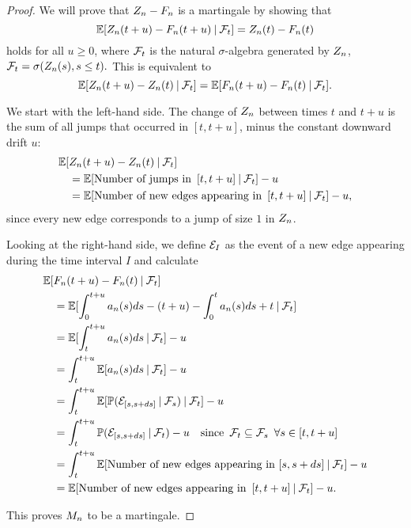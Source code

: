 \begin{proof} \label{P: decomp Zn}
	We will prove that $Z_n - F_n$ is a martingale by showing that
	\begin{equation} \label{E: Mn martingale}
	\mathbb{E}[ Z_n(t+u) - F_n(t+u) \: | \: \mathcal{F}_{t} ] = Z_n(t) - F_n(t)
	\end{equation}
	holds for all $u \geq 0$, where $\mathcal{F}_{t}$ is the natural $\sigma$-algebra generated by $Z_n$, 
	$\mathcal{F}_{t} = \sigma(Z_n(s), s \leq t).$
	This is equivalent to 
	\begin{equation}
	\mathbb{E}[Z_n(t+u) - Z_n(t) \: | \: \mathcal{F}_{t}] = \mathbb{E}[F_n(t+u) - F_n(t) \: | \: \mathcal{F}_{t}].
	\end{equation}
	
	We start with the left-hand side. 
	The change of $Z_n$ between times $t$ and $t+u$ is the sum of all jumps that occurred in $[t, t+u]$,
	minus the constant downward drift $u$:
	\begin{align*}
	\mathbb{E}[&Z_n(t+u) - Z_n(t) \: | \: \mathcal{F}_{t}] \\
	&= \mathbb{E}[\text{Number of jumps in} \enspace [t, t+u] \: | \: \mathcal{F}_{t}] - u \\
	&= \mathbb{E}[\text{Number of new edges appearing in} \enspace [t, t+u] \: | \: \mathcal{F}_{t}] - u,
	\end{align*}
	since every new edge corresponds to a jump of size $1$ in $Z_n$.
	
	Looking at the right-hand side, we define $\mathcal{E}_{I}$ as the event of a new edge appearing during the time interval $I$ and calculate
	\begin{align*}
	\mathbb{E}[&F_n(t+u) - F_n(t) \: | \: \mathcal{F}_{t}] \\
	&= \mathbb{E}[ \int_{0}^{t+u} a_n(s)ds - (t+u) - \int_{0}^{t} a_n(s)ds + t \: | \: \mathcal{F}_{t} ] \\
	&= \mathbb{E}[ \int_{t}^{t+u} a_n(s)ds \: | \: \mathcal{F}_{t} ] - u \\
	&= \int_{t}^{t+u} \mathbb{E}[a_n(s)ds \: | \: \mathcal{F}_{t}] - u \\
	&= \int_{t}^{t+u} \mathbb{E}[ \mathbb{P}(\mathcal{E}_{[s, s+ds]} \: | \: \mathcal{F}_{s}) \: | \: \mathcal{F}_{t} ] - u\\
	&= \int_{t}^{t+u} \mathbb{P}( \mathcal{E}_{[s, s+ds]} \: | \: \mathcal{F}_{t} ) - u
	\quad \text{since} \enspace \mathcal{F}_{t} \subseteq \mathcal{F}_{s} \enspace \forall s \in [t,t+u] \\
	&= \int_{t}^{t+u} \mathbb{E}[ \text{Number of new edges appearing in $[s, s+ds]$} \: | \: \mathcal{F}_{t}] -u \\
	&= \mathbb{E}[\text{Number of new edges appearing in} \enspace [t, t+u] \: | \: \mathcal{F}_{t}] - u.
	\end{align*}
	
	
	This proves $M_n$ to be a martingale. 	
\end{proof}

